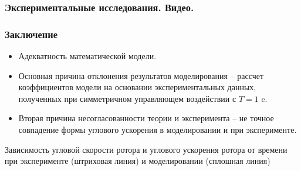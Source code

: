 \begin{frame}
\frametitle{Экспериментальные исследования. Видео.}

\begin{figure}[ht]
\end{figure}


\end{frame}



\begin{frame}
\frametitle{Заключение}
\begin{itemize}
	\item Адекватность математической модели.
	\item Основная причина отклонения результатов моделирования -- рассчет коэффициентов модели на основании экспериментальных  данных, полученных при симметричном управляющем воздействии с $T = 1 $ c.
	\item Вторая причина несогласованности теории и эксперимента -- не точное совпадение формы углового ускорения в моделировании и при эксперименте.
\end{itemize}

Зависимость угловой скорости ротора и углового ускорения ротора от времени при эксперименте (штриховая линия) и моделировании (сплошная линия)

\begin{minipage}[t]{0.47\linewidth}
\end{minipage}
\hfill
\begin{minipage}[t]{0.47\linewidth}
\end{minipage}

\end{frame}

